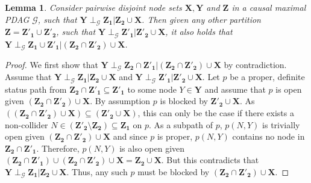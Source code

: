 \documentclass[11pt,a4paper]{article}
\newtheorem{Lemma}[Satz]{Lemma}
\theoremstyle{definition}
\theoremstyle{remark}
\newcommand{\mpdag}{maximal PDAG}
\newcommand{\g}[1][G]{\mathcal{#1}}
\begin{document}
\begin{Lemma}
	\label{lemma max size unique}
	Consider pairwise disjoint node sets $\mathbf{X},\mathbf{Y}$ and $\mathbf{Z}$ in a causal \mpdag{} $\g$, such that 
$\mathbf{Y} \perp_{\g} \mathbf{Z_1} | \mathbf{Z_2} \cup \mathbf{X}$. 
	Then given any other partition $\mathbf{Z} = \mathbf{Z'_1} \cup \mathbf{Z'_2}$, such that $\mathbf{Y} \perp_{\g} \mathbf{Z'_1} | \mathbf{Z'_2} \cup \mathbf{X}$, it also holds that $\mathbf{Y} \perp_{\g} \mathbf{Z_1} \cup \mathbf{Z'_1} | (\mathbf{Z_2} \cap \mathbf{Z'_2}) \cup \mathbf{X}$.
\end{Lemma}

\begin{proof}
	 We first show that $\mathbf{Y} \perp_{\g} \mathbf{Z_2} \cap \mathbf{Z'_1}| (\mathbf{Z_2} \cap \mathbf{Z'_2}) \cup \mathbf{X}$ by contradiction. Assume that $\mathbf{Y} \perp_{\g} \mathbf{Z_1} | \mathbf{Z_2}  \cup \mathbf{X}$ and $\mathbf{Y} \perp_{\g} \mathbf{Z'_1} | \mathbf{Z'_2}  \cup \mathbf{X}$. Let $p$ be a proper, definite status path from $\mathbf{Z_2} \cap \mathbf{Z'_1} \subseteq \mathbf{Z'_1}$ to some node $Y \in \mathbf{Y}$ and assume that $p$ is open given $(\mathbf{Z_2} \cap \mathbf{Z'_2}) \cup \mathbf{X}$. By assumption $p$ is blocked by $\mathbf{Z'_2}  \cup \mathbf{X}$. As $((\mathbf{Z_2} \cap \mathbf{Z'_2}) \cup \mathbf{X}) \subseteq (\mathbf{Z'_2}\cup \mathbf{X})$, this can only be the case if there exists a non-collider $N \in (\mathbf{Z'_2} \setminus \mathbf{Z_2}) \subseteq \mathbf{Z_1}$ on $p$. As a subpath of $p$, $p(N,Y)$ is trivially open given $(\mathbf{Z_2} \cap \mathbf{Z'_2}) \cup \mathbf{X}$ and since $p$ is proper, $p(N,Y)$ contains no node in $\mathbf{Z_2} \cap \mathbf{Z'_1}$. Therefore, $p(N,Y)$ is also open given $(\mathbf{Z_2} \cap \mathbf{Z'_1}) \cup (\mathbf{Z_2} \cap \mathbf{Z'_2}) \cup \mathbf{X}= \mathbf{Z_2} \cup \mathbf{X}$. But this contradicts that $\mathbf{Y} \perp_{\g} \mathbf{Z_1} | \mathbf{Z_2} \cup \mathbf{X}$. Thus, any such $p$ must be blocked by $(\mathbf{Z_2} \cap \mathbf{Z'_2}) \cup \mathbf{X}$.
	  

\end{proof}
\end{document}
